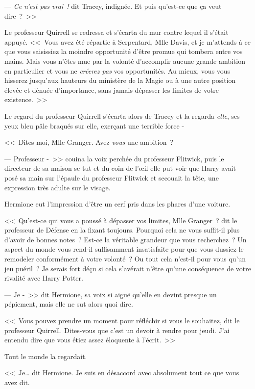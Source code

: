 --- \emph{Ce n'est pas vrai~!}  dit Tracey, indignée. Et puis qu'est-ce que ça veut dire~?~>>

Le professeur Quirrell se redressa et s'écarta du mur contre lequel il s'était appuyé. <<~Vous avez été répartie à Serpentard, Mlle Davis, et je m'attends à ce que vous saisissiez la moindre opportunité d'être promue qui tombera entre vos mains. Mais vous n'êtes mue par la volonté d'accomplir aucune grande ambition en particulier et vous ne \emph{créerez pas} vos opportunités. Au mieux, vous vous hisserez jusqu'aux hauteurs du ministère de la Magie ou à une autre position élevée et dénuée d'importance, sans jamais dépasser les limites de votre existence.~>>

Le regard du professeur Quirrell s'écarta alors de Tracey et la regarda \emph{elle}, ses yeux bleu pâle braqués sur elle, exerçant une terrible force -

<<~Dites-moi, Mlle Granger. Avez-\emph{vous} une ambition~?

--- Professeur -~>> couina la voix perchée du professeur Flitwick, puis le directeur de sa maison se tut et du coin de l'œil elle put voir que Harry avait posé sa main sur l'épaule du professeur Flitwick et secouait la tête, une expression très adulte sur le visage.

Hermione eut l'impression d'être un cerf pris dans les phares d'une voiture.

<<~Qu'est-ce qui vous a poussé à dépasser vos limites, Mlle Granger~? dit le professeur de Défense en la fixant toujours. Pourquoi cela ne vous suffit-il plus d'avoir de bonnes notes~? Est-ce la véritable grandeur que vous recherchez~? Un aspect du monde vous rend-il suffisamment insatisfaite pour que vous dussiez le remodeler conformément à votre volonté~? Ou tout cela n'est-il pour vous qu'un jeu puéril~? Je serais fort déçu si cela s'avérait n'être qu'une conséquence de votre rivalité avec Harry Potter.

--- Je -~>> dit Hermione, sa voix si aiguë qu'elle en devint presque un pépiement, mais elle ne sut alors quoi dire.

<<~Vous pouvez prendre un moment pour réfléchir si vous le souhaitez, dit le professeur Quirrell. Dites-vous que c'est un devoir à rendre pour jeudi. J'ai entendu dire que vous étiez assez éloquente à l'écrit.~>>

Tout le monde la regardait.

<<~Je… dit Hermione. Je suis en désaccord avec absolument tout ce que vous avez dit.

